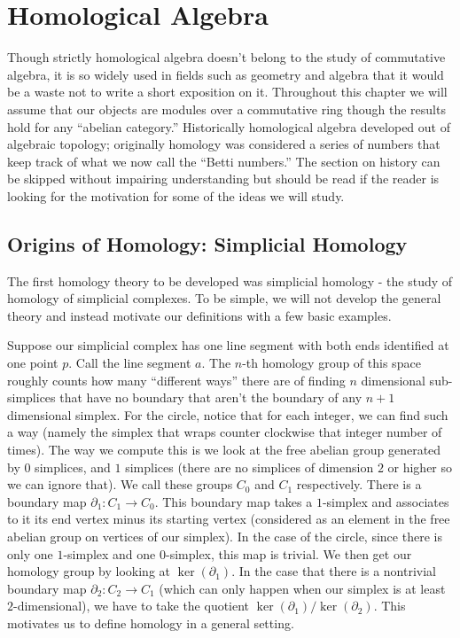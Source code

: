 \chapter{Homological Algebra} 

Though strictly homological algebra doesn't
belong to the study of commutative algebra, it is so widely used in fields
such as geometry and algebra that it would be a waste not to write a short
exposition on it. Throughout this chapter we will assume that our objects are
modules over a commutative ring though the results hold for any ``abelian
category.'' Historically homological algebra developed out of algebraic
topology; originally homology was considered a series of numbers that keep
track of what we now call the ``Betti numbers.'' The section on history can
be skipped without impairing understanding but should be read if the reader
is looking for the motivation for some of the ideas we will study.

\section{Origins of Homology: Simplicial Homology}

The first homology theory
to be developed was simplicial homology - the study of homology of simplicial
complexes. To be simple, we will not develop the general theory and instead
motivate our definitions with a few basic examples.  

\begin{example} Suppose
our simplicial complex has one line segment with both ends identified at
one point $p$. Call the line segment $a$. The $n$-th homology group of this
space roughly counts how many ``different ways'' there are of finding $n$
dimensional sub-simplices that have no boundary that aren't the boundary of
any $n+1$ dimensional simplex. For the circle, notice that for each integer,
we can find such a way (namely the simplex that wraps counter clockwise that
integer number of times). The way we compute this is we look at the free abelian group generated by $0$ simplices, and $1$ simplices (there are no simplices of
dimension $2$ or higher so we can ignore that). We call these groups $C_0$ and
$C_1$ respectively. There is a boundary map $\partial_1: C_1\rightarrow C_0$.
This boundary map takes a $1$-simplex and associates to it its end vertex minus
its starting vertex (considered as an element in the free abelian group on
vertices of our simplex). In the case of the circle, since there is only one
$1$-simplex and one $0$-simplex, this map is trivial. We then get our homology
group by looking at $\ker(\partial_1)$. In the case that there is a nontrivial
boundary map $\partial_2: C_2\rightarrow C_1$ (which can only happen when our
simplex is at least $2$-dimensional), we have to take the quotient
$\ker(\partial_1)/\ker(\partial_2)$. This motivates us to define homology in a
general setting.
\end{example}

